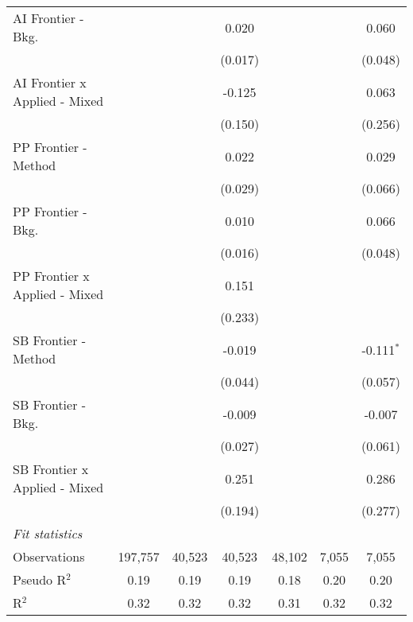 \begin{tabular}{lcccccc}
   AI Frontier - Bkg.            &               &               & 0.020        &              &              & 0.060\\   
                                 &               &               & (0.017)      &              &              & (0.048)\\   
   AI Frontier x Applied - Mixed &               &               & -0.125       &              &              & 0.063\\   
                                 &               &               & (0.150)      &              &              & (0.256)\\   
   PP Frontier - Method          &               &               & 0.022        &              &              & 0.029\\   
                                 &               &               & (0.029)      &              &              & (0.066)\\   
   PP Frontier - Bkg.            &               &               & 0.010        &              &              & 0.066\\   
                                 &               &               & (0.016)      &              &              & (0.048)\\   
   PP Frontier x Applied - Mixed &               &               & 0.151        &              &              &   \\   
                                 &               &               & (0.233)      &              &              &   \\   
   SB Frontier - Method          &               &               & -0.019       &              &              & -0.111$^{*}$\\   
                                 &               &               & (0.044)      &              &              & (0.057)\\   
   SB Frontier - Bkg.            &               &               & -0.009       &              &              & -0.007\\   
                                 &               &               & (0.027)      &              &              & (0.061)\\   
   SB Frontier x Applied - Mixed &               &               & 0.251        &              &              & 0.286\\   
                                 &               &               & (0.194)      &              &              & (0.277)\\   
   \midrule
   \emph{Fit statistics}\\
   Observations                  & 197,757       & 40,523        & 40,523       & 48,102       & 7,055        & 7,055\\  
   Pseudo R$^2$                  & 0.19          & 0.19          & 0.19         & 0.18         & 0.20         & 0.20\\  
   R$^2$                         & 0.32          & 0.32          & 0.32         & 0.31         & 0.32         & 0.32\\  
   

\end{tabular}
